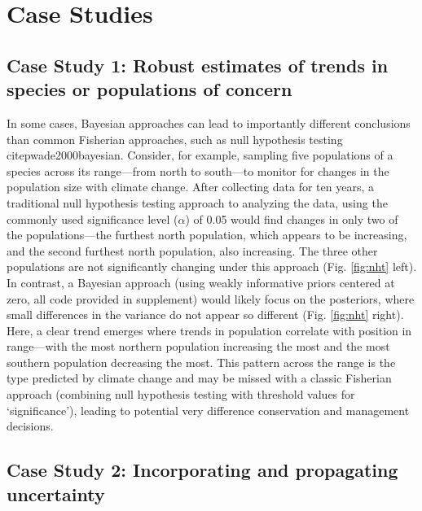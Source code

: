 \documentclass{article}
\begin{document}
\section* {Case Studies}
\subsection*{Case Study 1: Robust estimates of trends in species or populations of concern}
\par In some cases, Bayesian approaches can lead to importantly different conclusions than common Fisherian approaches, such as null hypothesis testing citep{wade2000bayesian}. Consider, for example, sampling five populations of a species across its range---from north to south---to monitor for changes in the population size with climate change. After collecting data for ten years, a traditional null hypothesis testing approach to analyzing the data, using the commonly used significance level ($\alpha$) of 0.05 would find changes in only two of the populations---the furthest north population, which appears to be increasing, and the second furthest north population, also increasing. The three other populations are not significantly changing under this approach (Fig. \ref{fig:nht} left). In contrast, a Bayesian approach (using weakly informative priors centered at zero, all code provided in supplement) would likely focus on the posteriors, where small differences in the variance do not appear so different  (Fig. \ref{fig:nht} right). Here, a clear trend emerges where trends in population correlate with position in range---with the most northern population increasing the most and the most southern population decreasing the most. This pattern across the range is the type predicted by climate change and may be missed with a classic Fisherian approach (combining null hypothesis testing with threshold values for `significance'), leading to potential very difference conservation and management decisions. %


\subsection*{Case Study 2: Incorporating and propagating uncertainty}
\end{document}
